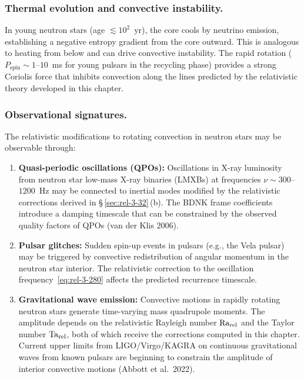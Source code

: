 \subsubsection*{Thermal evolution and convective instability.}
In young neutron stars (age $\lesssim 10^2$~yr), the core cools by
neutrino emission, establishing a negative entropy gradient from the
core outward.  This is analogous to heating from below and can drive
convective instability.  The rapid rotation ($P_{\mathrm{spin}} \sim
1$--$10$~ms for young pulsars in the recycling phase) provides a strong
Coriolis force that inhibits convection along the lines predicted by
the relativistic theory developed in this chapter.

\subsubsection*{Observational signatures.}
The relativistic modifications to rotating convection in neutron stars
may be observable through:
\begin{enumerate}
  \item \textbf{Quasi-periodic oscillations (QPOs):} Oscillations in
    X-ray luminosity from neutron star low-mass X-ray binaries (LMXBs)
    at frequencies $\nu \sim 300$--$1200$~Hz may be connected to inertial
    modes modified by the relativistic corrections derived in
    \S\,\ref{sec:rel-3-32}\,(b).  The BDNK frame coefficients
    introduce a damping timescale that can be constrained
    by the observed quality factors of QPOs (van der Klis 2006).
  \item \textbf{Pulsar glitches:} Sudden spin-up events in pulsars
    (e.g., the Vela pulsar) may be triggered by convective redistribution
    of angular momentum in the neutron star interior.  The relativistic
    correction to the oscillation frequency~\eqref{eq:rel-3-280} affects
    the predicted recurrence timescale.
  \item \textbf{Gravitational wave emission:} Convective motions in
    rapidly rotating neutron stars generate time-varying mass
    quadrupole moments.  The amplitude depends on the relativistic
    Rayleigh number $\mathrm{Ra}_{\mathrm{rel}}$ and the Taylor number $\mathrm{Ta}_{\mathrm{rel}}$, both of
    which receive the corrections computed in this chapter.  Current
    upper limits from LIGO/Virgo/KAGRA on continuous gravitational
    waves from known pulsars are beginning to constrain the amplitude
    of interior convective motions (Abbott et al.\ 2022).
\end{enumerate}


